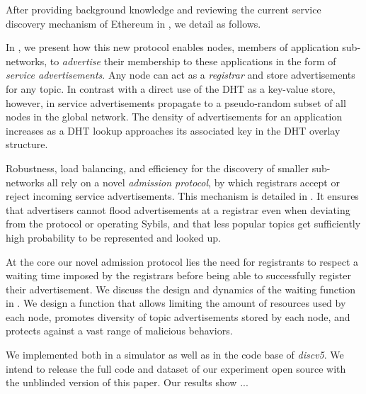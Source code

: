 After providing background knowledge and reviewing the current service discovery mechanism of Ethereum in , we detail \sysname as follows.

In , we present how this new protocol enables nodes, members of application sub-networks, to \emph{advertise} their membership to these applications in the form of \emph{service advertisements}.
Any node can act as a \emph{registrar} and store advertisements for any topic.
In contrast with a direct use of the DHT as a key-value store, however, in \sysname service advertisements propagate to a pseudo-random subset of all nodes in the global network.
The density of advertisements for an application increases as a DHT lookup approaches its associated key in the DHT overlay structure.

Robustness, load balancing, and efficiency for the discovery of smaller sub-networks all rely on a novel \emph{admission protocol}, by which registrars accept or reject incoming service advertisements.
This mechanism is detailed in .
It ensures that advertisers cannot flood advertisements at a registrar even when deviating from the protocol or operating Sybils, and that less popular topics get sufficiently high probability to be represented and looked up.  

At the core our novel admission protocol lies the need for registrants to respect a waiting time imposed by the registrars before being able to successfully register their advertisement.
We discuss the design and dynamics of the waiting function in .
We design a function that allows limiting the amount of resources used by each node, promotes diversity of topic advertisements stored by each node, and protects against a vast range of malicious behaviors.

We implemented \sysname both in a simulator as well as in the code base of \emph{discv5}.
We intend to release the full code and dataset of our experiment open source with the unblinded version of this paper.
Our results show ...

